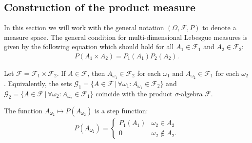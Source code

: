\subsection{Construction of the product measure}

    In this section we will work with the general notation $(\Omega,\mathcal{F},P)$ to denote a measure space. The general condition for multi-dimensional Lebesgue measures is given by the following equation which should hold for all $A_1\in\mathcal{F}_1$ and $A_2\in\mathcal{F}_2$:
    \begin{gather}
        \label{lebesgue:product_measure:general_condition}
        P(A_1\times A_2) = P_1(A_1)P_2(A_2).
    \end{gather}

    \begin{property}
        Let $\mathcal{F} = \mathcal{F}_1\times\mathcal{F}_2$. If $A\in\mathcal{F}$, then $A_{\omega_1}\in\mathcal{F}_2$ for each $\omega_1$ and $A_{\omega_2}\in\mathcal{F}_1$ for each $\omega_2$. Equivalently, the sets $\mathcal{G}_1 = \{A\in\mathcal{F}\,|\,\forall\omega_1:A_{\omega_1}\in\mathcal{F}_2\}$ and $\mathcal{G}_2 = \{A\in\mathcal{F}\,|\,\forall\omega_2: A_{\omega_2}\in\mathcal{F}_1\}$ coincide with the product $\sigma$-algebra $\mathcal{F}$.
    \end{property}

    \begin{property}
        The function $A_{\omega_2}\mapsto P(A_{\omega_2})$ is a step function:
        \begin{gather*}
            P(A_{\omega_2}) =
            \begin{cases}
                P_1(A_1)&\omega_2\in A_2\\
                0&\omega_2\not\in A_2.
            \end{cases}
        \end{gather*}
    \end{property}

